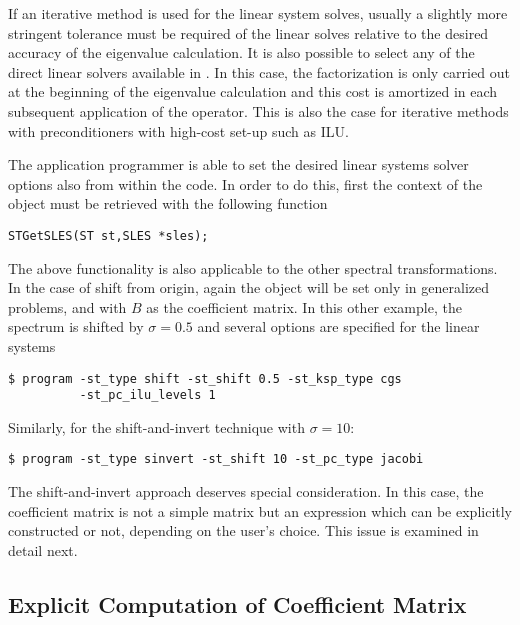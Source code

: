 	If an iterative method is used for the linear system solves, usually a slightly more stringent tolerance must be required of the linear solves relative to the desired accuracy of the eigenvalue calculation. It is also possible to select any of the direct linear solvers available in \petsc. In this case, the factorization is only carried out at the beginning of the eigenvalue calculation and this cost is amortized in each subsequent application of the operator. This is also the case for iterative methods with preconditioners with high-cost set-up such as ILU.

	The application programmer is able to set the desired linear systems solver options also from within the code. In order to do this, first the context of the  object must be retrieved with the following function
	\begin{Verbatim}[fontsize=\small]
	STGetSLES(ST st,SLES *sles);
	\end{Verbatim}
	
	The above functionality is also applicable to the other spectral transformations. In the case of shift from origin, again the  object will be set only in generalized problems, and with $B$ as the coefficient matrix. In this other example, the spectrum is shifted by $\sigma=0.5$ and several options are specified for the linear systems
\begin{Verbatim}[fontsize=\small]
	$ program -st_type shift -st_shift 0.5 -st_ksp_type cgs 
		  -st_pc_ilu_levels 1
\end{Verbatim}

	Similarly, for the shift-and-invert technique with $\sigma=10$:
\begin{Verbatim}[fontsize=\small]
	$ program -st_type sinvert -st_shift 10 -st_pc_type jacobi
\end{Verbatim}
	The shift-and-invert approach deserves special consideration. In this case, the coefficient matrix is not a simple matrix but an expression which can be explicitly constructed or not, depending on the user's choice. This issue is examined in detail next.

\subsection{Explicit Computation of Coefficient Matrix}
\label{sec:explicit}

